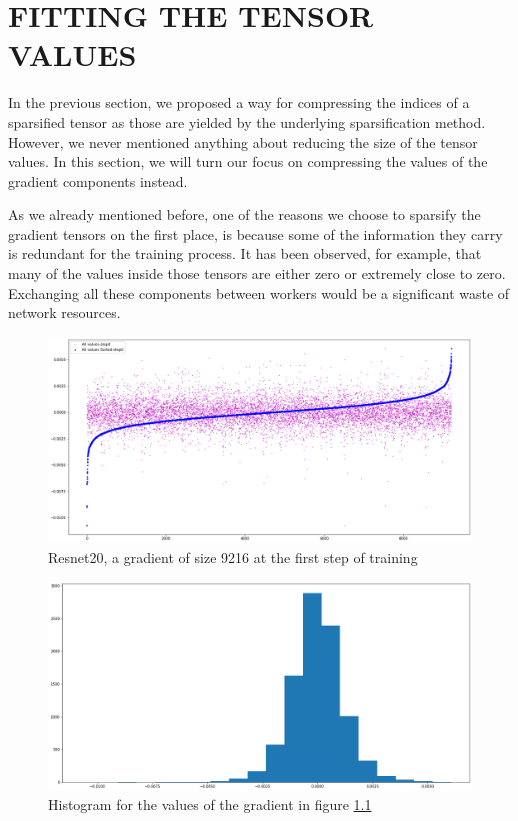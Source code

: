 \chapter{FITTING THE TENSOR VALUES}
    
    In the previous section, we proposed a way for compressing the indices of a sparsified tensor as those are yielded by the underlying sparsification method.
    However, we never mentioned anything about reducing the size of the tensor values.
    In this section, we will turn our focus on compressing the values of the gradient components instead.
    
    As we already mentioned before, one of the reasons we choose to sparsify the gradient tensors on the first place, is because some of the information they carry is redundant for the training process.
    It has been observed, for example, that many of the values inside those tensors are either zero or extremely close to zero.
    Exchanging all these components between workers would be a significant waste of network resources. 

    \begin{figure}[h]
    \centering
    \includegraphics[width=1\textwidth]{thesis/figures/gradient29-step0.png}
    \caption{Resnet20, a gradient of size 9216 at the first step of training}
    \label{gradient29-step0}
    \end{figure}
    
    \begin{figure}[h]
    \centering
    \includegraphics[width=1\textwidth]{thesis/figures/histogram.png}
    \caption{Histogram for the values of the gradient in figure \ref{gradient29-step0}}
    \label{histogram}
    \end{figure}
    
